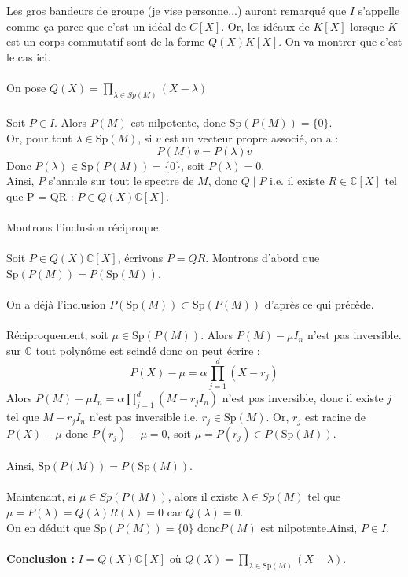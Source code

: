 \documentclass[a4paper,12pt]{article}
\begin{document}
    \begin{correctionbox}
        Les gros bandeurs de groupe (je vise personne...) auront remarqué que $I$ s'appelle comme ça parce que c'est un idéal de \(C[X]\). Or, les idéaux de \(K[X]\) lorsque $K$ est un corps commutatif sont de la forme \(Q(X)K[X]\). On va montrer que c'est le cas ici. \\\\
        On pose \(Q(X) = \prod_{\lambda \in Sp(M)} (X - \lambda)\)\\\\
        Soit \( P \in I \). Alors \( P(M) \) est nilpotente, donc \( \mathrm{Sp}(P(M)) = \{0\} \). \\[2pt]
        Or, pour tout \( \lambda \in \mathrm{Sp}(M) \), si \( v \) est un vecteur propre associé, on a :
        \[
        P(M)v = P(\lambda)v
        \]
        Donc \( P(\lambda) \in \mathrm{Sp}(P(M)) = \{0\} \), soit \( P(\lambda) = 0 \). \\[2pt]
        Ainsi, \( P \) s'annule sur tout le spectre de \( M \), donc \( Q \mid P \) i.e. il existe \(R \in \mathbb{C}[X]\) tel que P = QR : \( P \in Q(X) \mathbb{C}[X] \). \\\\
        Montrons l'inclusion réciproque.\\\\
        Soit \( P \in Q(X) \mathbb{C}[X] \), écrivons \( P = QR \). Montrons d'abord que \( \mathrm{Sp}(P(M)) = P(\mathrm{Sp}(M)) \). \\\\
        On a déjà l'inclusion \( P(\mathrm{Sp}(M)) \subset \mathrm{Sp}(P(M)) \) d'après ce qui précède. \\\\
        Réciproquement, soit \( \mu \in \mathrm{Sp}(P(M)) \). Alors \( P(M) - \mu I_n \) n'est pas inversible. \\[2pt]
        sur \( \mathbb{C} \) tout polynôme est scindé donc on peut écrire :
        \[
        P(X) - \mu = \alpha \prod_{j=1}^d (X - r_j)
        \]
        Alors \( P(M) - \mu I_n = \alpha \prod_{j=1}^d (M - r_j I_n) \) n'est pas inversible, donc il existe \( j \) tel que \( M - r_j I_n \) n'est pas inversible i.e. \( r_j \in \mathrm{Sp}(M) \). Or, \( r_j\) est racine de \(P(X) - \mu\) donc \( P(r_j) - \mu = 0 \), soit \( \mu = P(r_j) \in P(\mathrm{Sp}(M)) \). \\\\
        Ainsi, \( \mathrm{Sp}(P(M)) = P(\mathrm{Sp}(M)) \). \\\\
        Maintenant, si \( \mu \in Sp(P(M)) \), alors il existe \(\lambda \in Sp(M)\) tel que \(\mu = P(\lambda) = Q(\lambda)R(\lambda) = 0\) car \(Q(\lambda) = 0\). \\
        On en déduit que \( \mathrm{Sp}(P(M)) = \{0\} \) donc\( P(M) \) est nilpotente.Ainsi, \( P \in I \). \\\\
        \textbf{Conclusion :} \( I = Q(X) \mathbb{C}[X] \) où \( Q(X) = \prod_{\lambda \in \mathrm{Sp}(M)} (X - \lambda) \).
    \end{correctionbox}
\end{document}
